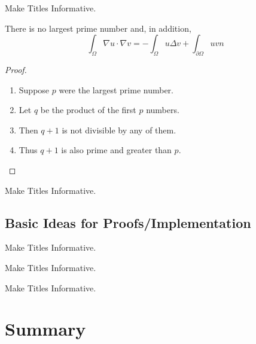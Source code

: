 \documentclass[ucs,9pt]{beamer}
\begin{document}
\begin{frame}{Make Titles Informative.}
\begin{theorem}
 There is no largest prime number and, in addition, $$\int_\Omega \nabla u \cdot \nabla v = - \int_\Omega u \Delta v + \int_{\partial\Omega} u v n$$
 \end{theorem}
 \begin{proof}
 \begin{enumerate}
 \item<1-> Suppose $p$ were the largest prime number.
 \item<2-> Let $q$ be the product of the first $p$ numbers.
 \item<3-> Then $q + 1$ is not divisible by any of them.
 \item<1-> Thus $q + 1$ is also prime and greater than $p$.\qedhere
 \end{enumerate} 
 \end{proof}
\end{frame}

\begin{frame}{Make Titles Informative.}
\end{frame}


\subsection{Basic Ideas for Proofs/Implementation}

\begin{frame}{Make Titles Informative.}
\end{frame}

\begin{frame}{Make Titles Informative.}
\end{frame}

\begin{frame}{Make Titles Informative.}
\end{frame}



\section*{Summary}
\end{document}

